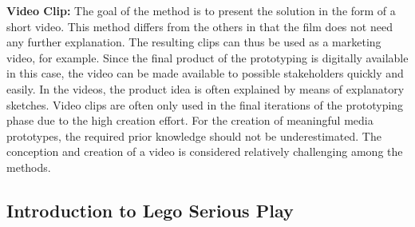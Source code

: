 \textbf{Video Clip:} The goal of the method is to present the solution in the form of a short video. This method differs from the others in that the film does not need any further explanation. The resulting clips can thus be used as a marketing video, for example. Since the final product of the prototyping is digitally available in this case, the video can be made available to possible stakeholders quickly and easily. In the videos, the product idea is often explained by means of explanatory sketches. Video clips are often only used in the final iterations of the prototyping phase due to the high creation effort. For the creation of meaningful media prototypes, the required prior knowledge should not be underestimated. The conception and creation of a video is considered relatively challenging among the methods. 

\newpage

\subsection{Introduction to Lego Serious Play}